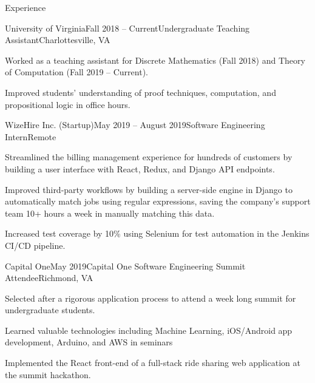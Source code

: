 \documentclass{resume}
\begin{document}
\begin{rSection}{Experience}

  \begin{rSubsection}{University of Virginia}{Fall 2018 -- Current}{Undergraduate Teaching Assistant}{Charlottesville, VA}
    \item Worked as a teaching assistant for Discrete Mathematics (Fall 2018) and Theory of Computation (Fall 2019 -- Current).
    \item Improved students' understanding of proof techniques, computation, and propositional logic in office hours.
  \end{rSubsection}

  \begin{rSubsection}{WizeHire Inc. (Startup)}{May 2019 -- August 2019}{Software Engineering Intern}{Remote}
    \item Streamlined the billing management experience for hundreds of customers by building a user interface with React, Redux, and Django API endpoints.
    \item Improved third-party workflows by building a server-side engine in Django to automatically match jobs using regular expressions, saving the company's support team 10+ hours a week in manually matching this data.
    \item Increased test coverage by 10\% using Selenium for test automation in the Jenkins CI/CD pipeline.
  \end{rSubsection}

  \begin{rSubsection}{Capital One}{May 2019}{Capital One Software Engineering Summit Attendee}{Richmond, VA}
    \item Selected after a rigorous application process to attend a week long summit for undergraduate students.
    \item Learned valuable technologies including Machine Learning, iOS/Android app development, Arduino, and AWS in seminars
    \item Implemented the React front-end of a full-stack ride sharing web application at the summit hackathon.
  \end{rSubsection}


\end{rSection}
\end{document}
